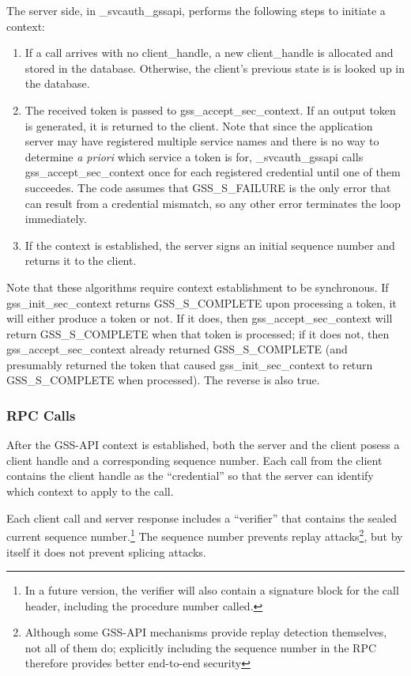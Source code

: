 The server side, in _svcauth_gssapi, performs the following steps to
initiate a context:

\begin{enumerate}
\item If a call arrives with no client_handle, a new client_handle is
allocated and stored in the database.  Otherwise, the client's
previous state is is looked up in the database.

\item The received token is passed to gss_accept_sec_context.  If an
output token is generated, it is returned to the client.  Note that
since the application server may have registered multiple service
names and there is no way to determine {\it a priori} which service a
token is for, _svcauth_gssapi calls gss_accept_sec_context once for
each registered credential until one of them succeedes.  The code
assumes that GSS_S_FAILURE is the only error that can result from a
credential mismatch, so any other error terminates the loop
immediately.

\item If the context is established, the server signs an initial
sequence number and returns it to the client.
\end{enumerate}

Note that these algorithms require context establishment to be
synchronous.  If gss_init_sec_context returns GSS_S_COMPLETE upon
processing a token, it will either produce a token or not.  If it
does, then gss_accept_sec_context will return GSS_S_COMPLETE when that
token is processed; if it does not, then gss_accept_sec_context
already returned GSS_S_COMPLETE (and presumably returned the token
that caused gss_init_sec_context to return GSS_S_COMPLETE when
processed).  The reverse is also true.

\subsubsection{RPC Calls}

After the GSS-API context is established, both the server and the
client posess a client handle and a corresponding sequence number.
Each call from the client contains the client handle as the
``credential'' so that the server can identify which context to apply
to the call.

Each client call and server response includes a ``verifier'' that
contains the sealed current sequence number.\footnote{In a future
version, the verifier will also contain a signature block for the call
header, including the procedure number called.} The sequence number
prevents replay attacks\footnote{Although some GSS-API mechanisms
provide replay detection themselves, not all of them do; explicitly
including the sequence number in the RPC therefore provides better
end-to-end security}, but by itself it does not prevent splicing
attacks.

